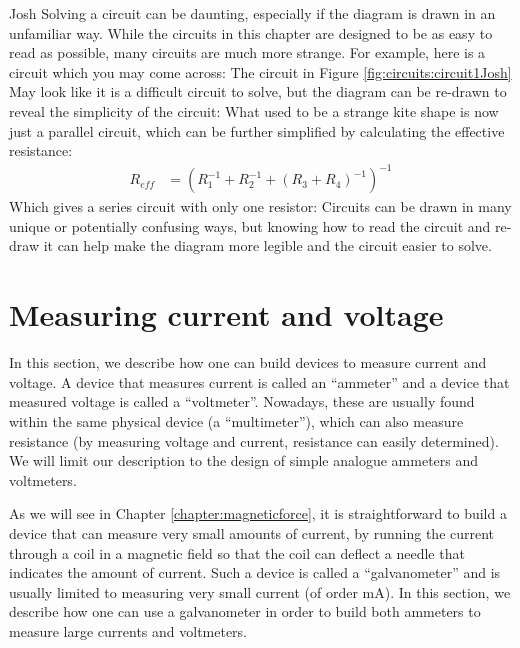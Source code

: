 \vspace{-0.25cm}
\begin{studentOpinion}{Josh}{}
Solving a circuit can be daunting, especially if the diagram is drawn in an unfamiliar  way. While the circuits in this chapter are designed to be as easy to read as possible, many circuits are much more strange. For example, here is a circuit which you may come across:
The circuit in Figure \ref{fig:circuits:circuit1Josh} May look like it is a difficult circuit to solve, but the diagram can be re-drawn to reveal the simplicity of the circuit:
What used to be a strange kite shape is now just a parallel circuit, which can be further simplified by calculating the effective resistance:
\begin{align*}
R_{eff} &= (R_1^{-1}+R_2^{-1}+(R_3+R_4)^{-1})^{-1}
\end{align*}
Which gives a series circuit with only one resistor:
Circuits can be drawn in many unique or potentially confusing ways, but knowing how to read the circuit and re-draw it can help make the diagram more legible and the circuit easier to solve.
\end{studentOpinion}

\section{Measuring current and voltage}
In this section, we describe how one can build devices to measure current and voltage. A device that measures current is called an ``ammeter'' and a device that measured voltage is called a ``voltmeter''. Nowadays, these are usually found within the same physical device (a ``multimeter''), which can also measure resistance (by measuring voltage and current, resistance can easily determined). We will limit our description to the design of simple analogue ammeters and voltmeters. 

As we will see in Chapter \ref{chapter:magneticforce}, it is straightforward to build a device that can measure very small amounts of current, by running the current through a coil in a magnetic field so that the coil can deflect a needle that indicates the amount of current. Such a device is called a ``galvanometer'' and is usually limited to measuring very small current (of order \si{mA}). In this section, we describe how one can use a galvanometer in order to build both ammeters to measure large currents and voltmeters. 
